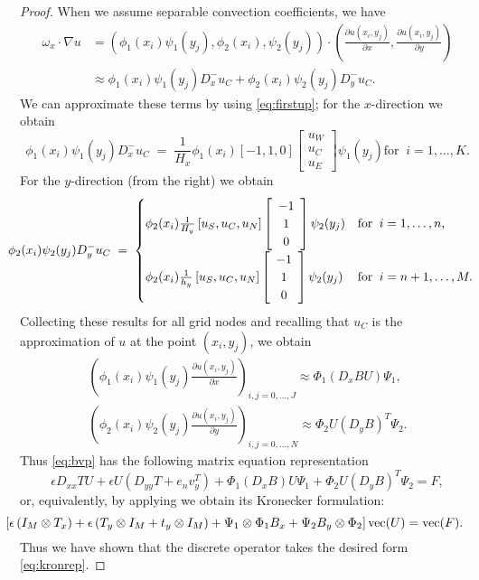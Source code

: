 \begin{proof}
When we assume separable convection coefficients, we have
\begin{align*}
\omega_x \cdot \nabla u &=(\phi_1(x_i)\psi_1(y_j),\phi_2(x_i),\psi_2(y_j))\cdot\left( \frac{\partial u(x_i,y_j)}{\partial x},\frac{\partial u(x_i,y_j)}{\partial y}\right)\\
&\approx \phi_1(x_i)\psi_1(y_j)D^{-}_{x} u_{C} + \phi_2(x_i)\psi_2(y_j)D^{-}_{y} u_{C}.
\end{align*}
 We can approximate these terms by using \eqref{eq:firstup}; for the $x$-direction we obtain
\begin{equation*}
\phi_1(x_i)\psi_1(y_j)D^{-}_{x} u_{C}\; =\;
\frac{1}{H_x}\phi_1(x_i)\left[-1,1,0\right]\left[\begin{array}{c} u_W\\u_C\\u_E\end{array}\right]\psi_1(y_j) \mbox{for}\;\; i=1,\ldots, K.
\end{equation*}
For the $y$-direction (from the right) we obtain
\begin{equation*}
\hspace*{-1em}\phi_2(x_i)\psi_2(y_j)D^{-}_{y} u_{C}\; =\;
\begin{cases} \phi_2(x_i)\frac{1}{H_y}\left[u_S,u_C,u_N\right]\left[\begin{array}{c} -1\\1\\0\end{array}\right]\psi_2(y_j) &\mbox{for}\;\; i=1,\ldots, n, \\
 \phi_2(x_i)\frac{1}{h_y}\left[u_S,u_C,u_N\right]\left[\begin{array}{c} -1\\1\\0\end{array}\right]\psi_2(y_j)&\mbox{for}\;\; i=n+1,\ldots, M.\end{cases}
\end{equation*}
Collecting these results for all grid nodes and recalling that $u_C$ is the approximation of $u$ at the point $(x_i,y_j)$, we obtain
\begin{eqnarray*}
\left(\phi_1(x_i)\psi_1(y_j)\frac{\partial u(x_i,y_j)}{\partial x}\right)_{i,j=0,\ldots,J}\approx\Phi_{1}(D_xBU)\Psi_{1},\\
\left(\phi_2(x_i)\psi_2(y_j)\frac{\partial u(x_i,y_j)}{\partial y}\right)_{i,j=0,\ldots,N}\approx\Phi_{2}U(D_yB)^T\Psi_{2}.
\end{eqnarray*}
Thus \eqref{eq:bvp} has the following matrix equation representation
\begin{equation*}
\epsilon D_{xx}TU + \epsilon U(D_{yy}T+e_nv_y^T) +\Phi_{1}(D_xB)U\Psi_{1}+\Phi_{2}U(D_yB)^T\Psi_{2}=F,
\end{equation*}
or, equivalently, by applying \cite[Lemma~6.5]{Dem97} we obtain its Kronecker formulation:
\[
\hspace*{-2em}
 \left[\epsilon \left(I_M\otimes T_x\right) +\epsilon\left(T_y\otimes I_M+t_y \otimes I_M\right) + \Psi_1 \otimes \Phi_1B_{x} + \Psi_2B_{y} \otimes \Phi_2\right]\text{vec}(U) =\text{vec}(F).
\]
Thus we have shown that the discrete operator takes the desired form \eqref{eq:kronrep}.
\end{proof}


